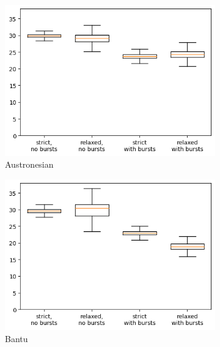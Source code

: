 \documentclass[a4paper,12pt]{scrartcl}
\begin{document}
\begin{figure}
  \centering
  \begin{subfigure}{0.4\textwidth}
    \includegraphics[width=\textwidth]{supplement/analysis/austronesian_replacement.png}
    \caption{Austronesian}
  \end{subfigure}
  \begin{subfigure}{0.4\textwidth}
    \includegraphics[width=\textwidth]{supplement/analysis/bantu_replacement.png}
    \caption{Bantu}
  \end{subfigure}
  \begin{subfigure}{0.4\textwidth}

\end{subfigure}
\end{figure}
\end{document}
